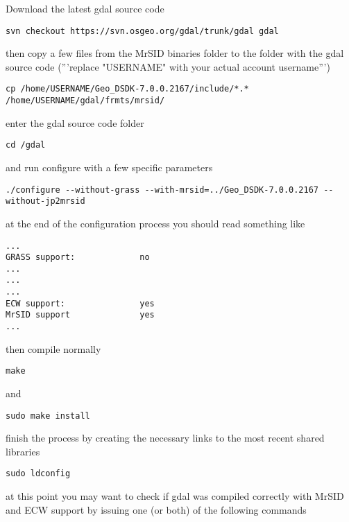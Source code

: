 Download the latest gdal source code

\begin{verbatim}
svn checkout https://svn.osgeo.org/gdal/trunk/gdal gdal
\end{verbatim}

then copy a few files from the MrSID binaries folder to the folder with the gdal source code
('''replace "USERNAME" with your actual account username''')

\begin{verbatim}
cp /home/USERNAME/Geo_DSDK-7.0.0.2167/include/*.* /home/USERNAME/gdal/frmts/mrsid/
\end{verbatim}

enter the gdal source code folder

\begin{verbatim}
cd /gdal
\end{verbatim}

and run configure with a few specific parameters

\begin{verbatim}
./configure --without-grass --with-mrsid=../Geo_DSDK-7.0.0.2167 --without-jp2mrsid
\end{verbatim}

at the end of the configuration process you should read something like

\begin{verbatim}
...
GRASS support:             no
...
...
...
ECW support:               yes
MrSID support              yes			
...
\end{verbatim}

then compile normally

\begin{verbatim}
make
\end{verbatim}

and

\begin{verbatim}
sudo make install
\end{verbatim}

finish the process by creating the necessary links to the most recent shared libraries

\begin{verbatim}
sudo ldconfig
\end{verbatim}

at this point you may want to check if gdal was compiled correctly with MrSID and ECW
support by issuing one (or both) of the following commands

